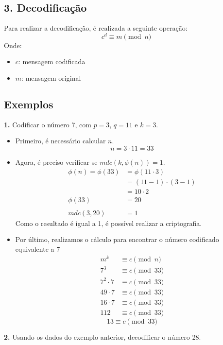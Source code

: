 \subsection*{3. Decodificação}
Para realizar a decodificação, é realizada a seguinte operação:
\[
    c^{d} \equiv m \pmod {n}
\]
Onde:
\begin{itemize}
    \item $c$: mensagem codificada
    \item $m$: mensagem original
\end{itemize}

\subsection*{Exemplos}
\textbf{1.} Codificar o número 7, com $p = 3$, $q = 11$ e $k = 3$.

\begin{itemize}
    \item Primeiro, é necessário calcular $n$.
          \[
              n = 3 \cdot 11 = 33
          \]
    \item Agora, é preciso verificar se $mdc(k, \phi(n)) = 1$.
          \begin{align*}
              \phi(n) = \phi(33) & = \phi(11 \cdot 3)       \\
                                 & = (11 - 1) \cdot (3 - 1) \\
                                 & = 10 \cdot 2             \\
              \phi(33)           & = 20
              \\
              \\
              mdc(3, 20)         & = 1
          \end{align*}
          Como o resultado é igual a 1, é possível realizar a criptografia.
    \item Por último, realizamos o cálculo para encontrar o número codificado equivalente a 7
          \begin{align*}
              m^{k}         & \equiv c \pmod {n}  \\
              7^{3}         & \equiv c \pmod {33} \\
              7^{2} \cdot 7 & \equiv c \pmod {33} \\
              49 \cdot 7    & \equiv c \pmod {33} \\
              16 \cdot 7    & \equiv c \pmod {33} \\
              112           & \equiv c \pmod {33}
          \end{align*}
          \[
              \boxed{
                  13 \equiv c \pmod {33}
              }
          \]
\end{itemize}
\vspace{24pt}
\textbf{2.} Usando os dados do exemplo anterior, decodificar o número 28.

